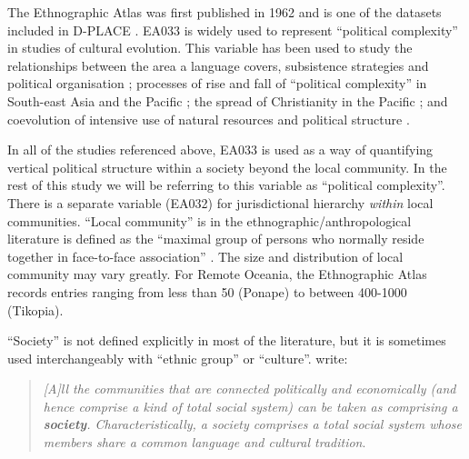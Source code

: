 \documentclass[a4paper,10pt]{article} %
\begin{document}
The Ethnographic Atlas was first published in 1962 and is one of the datasets included in D-PLACE \citep{d_place_all}. EA033 is widely used to represent ``political complexity'' in studies of cultural evolution. This variable has been used to study the relationships between the area a language covers, subsistence strategies and political organisation \citep{curriemace2009}; processes of rise and fall of ``political complexity'' in South-east Asia and the Pacific \citep{currie2010rise}; the spread of Christianity in the Pacific \citep{watts_2018}; and coevolution of intensive use of natural resources and political structure \citep{sheehan2018coevolution}.  

In all of the studies referenced above, EA033 is used as a way of quantifying vertical political structure within a society beyond the local community. In the rest of this study we will be referring to this variable as ``political complexity''. There is a separate variable (EA032) for jurisdictional hierarchy \emph{within} local communities. ``Local community'' is in the ethnographic/anthropological literature is defined as the ``maximal group of persons who normally reside together in face-to-face association'' \citep{yale1945outline}. The size and distribution of local community may vary greatly. For Remote Oceania, the Ethnographic Atlas records entries ranging from less than 50 (Ponape) to between 400-1000 (Tikopia).

``Society'' is not defined explicitly in most of the literature, but it is sometimes used interchangeably with ``ethnic group'' or ``culture''. \citet{roger1981cultural} write:

\begin{quotation}
\noindent\emph{[A]ll the communities that are connected politically and economically (and hence comprise a kind of total social system) can be taken as comprising a \textbf{society}. Characteristically, a society comprises a total social system whose members share a common language and cultural tradition}. 
\begin{flushright}
\citep[22]{roger1981cultural} 
\end{flushright}
 \end{quotation}

\end{document}
